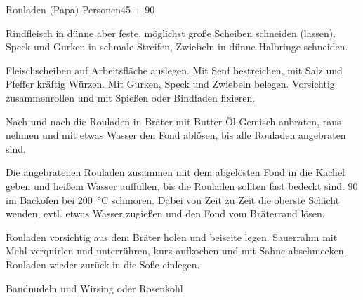 \begin{MyRecipe}{Rouladen (Papa)}{ Personen}{\SI{45}{\minuteprime} + \SI{90}{\minuteprime}}


Rindfleisch in dünne aber feste, möglichst große Scheiben schneiden (lassen).\\
Speck und Gurken in schmale Streifen, Zwiebeln in dünne Halbringe schneiden.\par\bigskip


Fleischscheiben auf Arbeitsfläche auslegen. Mit Senf bestreichen, mit Salz und Pfeffer kräftig Würzen. Mit Gurken, Speck und Zwiebeln belegen. Vorsichtig zusammenrollen und mit Spießen oder Bindfaden fixieren.\par
Nach und nach die Rouladen in Bräter mit Butter-Öl-Gemisch anbraten, raus nehmen und mit etwas Wasser den Fond ablösen, bis alle Rouladen angebraten sind.\par
Die angebratenen Rouladen zusammen mit dem abgelösten Fond in die Kachel geben und heißem Wasser auffüllen, bis die Rouladen sollten fast bedeckt sind. \SI{90}{\minuteprime} im Backofen bei \SI{200}{\degreeCelsius} schmoren. Dabei von Zeit zu Zeit die oberste Schicht wenden, evtl. etwas Wasser zugießen und den Fond vom Bräterrand lösen.\par\bigskip


Rouladen vorsichtig aus dem Bräter holen und beiseite legen. Sauerrahm mit Mehl verquirlen und unterrühren, kurz aufkochen und mit Sahne abschmecken. Rouladen wieder zurück in die Soße einlegen.\par\bigskip


Bandnudeln und Wirsing oder Rosenkohl

\end{MyRecipe}